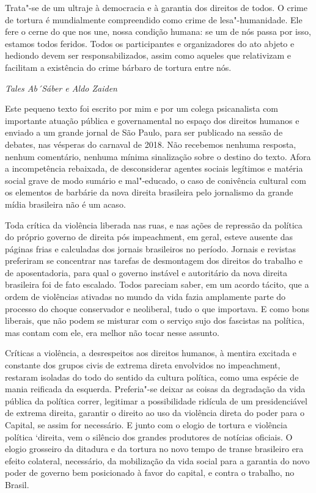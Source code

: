 Trata"-se de um ultraje à democracia e à garantia dos direitos de todos.
O crime de tortura é mundialmente compreendido como crime de
lesa"-humanidade. Ele fere o cerne do que nos une, nossa condição humana:
se um de nós passa por isso, estamos todos feridos. Todos os
participantes e organizadores do ato abjeto e hediondo devem ser
responsabilizados, assim como aqueles que relativizam e facilitam a
existência do crime bárbaro de tortura entre nós.

\begin{flushright}
\emph{Tales Ab´Sáber e Aldo Zaiden}
\end{flushright}

\begin{center}
\end{center}

Este pequeno texto foi escrito por mim e por um colega psicanalista com
importante atuação pública e governamental no espaço dos direitos
humanos e enviado a um grande jornal de São Paulo, para ser publicado na
sessão de debates, nas vésperas do carnaval de 2018. Não recebemos
nenhuma resposta, nenhum comentário, nenhuma mínima sinalização sobre o
destino do texto. Afora a incompetência rebaixada, de desconsiderar
agentes sociais legítimos e matéria social grave de modo sumário e
mal"-educado, o caso de conivência cultural com os elementos de barbárie
da nova direita brasileira pelo jornalismo da grande mídia brasileira
não é um acaso.

Toda crítica da violência liberada nas ruas, e nas ações de repressão da
política do próprio governo de direita pós impeachment, em geral, esteve
ausente das páginas frias e calculadas dos jornais brasileiros no
período. Jornais e revistas preferiram se concentrar nas tarefas de
desmontagem dos direitos do trabalho e de aposentadoria, para qual o
governo instável e autoritário da nova direita brasileira foi de fato
escalado. Todos pareciam saber, em um acordo tácito, que a ordem de
violências ativadas no mundo da vida fazia amplamente parte do processo
do choque conservador e neoliberal, tudo o que importava. E como bons
liberais, que não podem se misturar com o serviço sujo dos fascistas na
política, mas contam com ele, era melhor não tocar nesse assunto.

Críticas a violência, a desrespeitos aos direitos humanos, à mentira
excitada e constante dos grupos civis de extrema direta envolvidos no
impeachment, restaram isoladas do todo do sentido da cultura política,
como uma espécie de mania reificada da esquerda. Preferia"-se deixar as
coisas da degradação da vida pública da política correr, legitimar a
possibilidade ridícula de um presidenciável de extrema direita, garantir
o direito ao uso da violência direta do poder para o Capital, se assim
for necessário. E junto com o elogio de tortura e violência política
`direita, vem o silêncio dos grandes produtores de notícias oficiais. O
elogio grosseiro da ditadura e da tortura no novo tempo de transe
brasileiro era efeito colateral, necessário, da mobilização da vida
social para a garantia do novo poder de governo bem posicionado à favor
do capital, e contra o trabalho, no Brasil.

